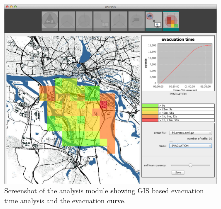 \begin{figure}
\includegraphics[width=1\textwidth]{extending/figures/Evacuation/it50_evac_time}
\caption{Screenshot of the analysis module showing GIS based evacuation time analysis and the evacuation curve.}\label{chap:evac:fig:analysis}
\end{figure}




